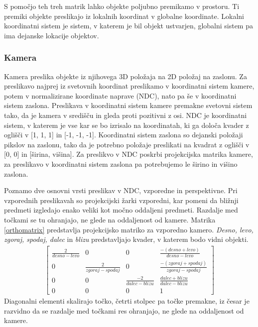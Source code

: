 \documentclass[a4paper, 12pt]{book}
\begin{document}
S pomočjo teh treh matrik lahko objekte poljubno premikamo v prostoru. Ti premiki objekte preslikajo iz lokalnih koordinat v globalne koordinate. Lokalni koordinatni sistem je sistem, v katerem je bil objekt ustvarjen, globalni sistem pa ima dejanske lokacije objektov.

\subsubsection*{Kamera}

Kamera preslika objekte iz njihovega 3D položaja na 2D položaj na zaslonu. Za preslikavo najprej iz svetovnih koordinat preslikamo v koordinatni sistem kamere, potem v normalizirane koordinate naprave (NDC), nato pa še v koordinatni sistem zaslona. Preslikava v koordinatni sistem kamere premakne svetovni sistem tako, da je kamera v središču in gleda proti pozitivni z osi. NDC je koordinatni sistem, v katerem je vse kar se bo izrisalo na koordinatah, ki ga določa kvader z oglišči v [1, 1, 1] in [-1, -1, -1]. Koordinatni sistem zaslona so dejanski položaji pikslov na zaslonu, tako da je potrebno položaje preslikati na kvadrat z oglišči v [0, 0] in [širina, višina]. Za preslikvo v NDC poskrbi projekcijska matrika kamere, za preslikavo v koordinatni sistem zaslona pa potrebujemo le širino in višino zaslona.

Poznamo dve osnovni vrsti preslikav v NDC, vzporedne in perspektivne. Pri vzporednih preslikavah so projekcijski žarki vzporedni, kar pomeni da bližnji predmeti izgledajo enako veliki kot močno oddaljeni predmeti. Razdalje med točkami se tu ohranjajo, ne glede na oddaljenost od kamere. Matrika \ref{orthomatrix} predstavlja projekcijsko matriko za vzporedno kamero. \emph{Desno, levo, zgoraj, spodaj, dalec} in \emph{blizu} predstavljajo kvader, v katerem bodo vidni objekti.
\begin{align}
\begin{bmatrix}
\frac{2}{desno-levo} & 0 & 0 & \frac{-(desno+levo)}{desno-levo}\\ 
0 & \frac{2}{zgoraj-spodaj} & 0 & \frac{-(zgoraj+spodaj)}{zgoraj-spodaj} \\ 
0 & 0 & \frac{-2}{dalec-blizu} & \frac{dalec+blizu}{dalec-blizu} \\ 
0 & 0 & 0 & 1
\end{bmatrix}
\label{orthomatrix}
\end{align}
Diagonalni elementi skalirajo točko, četrti stolpec pa točke premakne, iz česar je razvidno da se razdalje med točkami res ohranjajo, ne glede na oddaljenost od kamere.
\end{document}
